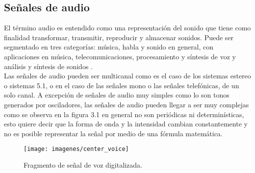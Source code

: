 
\subsection{Señales de audio}

El t\'ermino audio es entendido como una representaci\'on del sonido que tiene como finalidad transformar, transmitir, reproducir y almacenar sonidos. Puede ser segmentado en tres categor\'ias: m\'usica, habla y sonido en general, con aplicaciones en m\'usica, telecomunicaciones, procesamiento y s\'intesis de voz y an\'alisis y s\'intesis de sonidos \cite{schuller}.\\

Las señales de audio pueden ser multicanal como es el caso de los sistemas estereo o sistemas 5.1, o en el caso de las señales mono o las señales telef\'onicas, de un solo canal. A excepci\'on de señales de audio muy simples como lo son tonos generados por osciladores, las señales de audio pueden llegar a ser muy complejas como se observa en la figura 3.1 en general no son peri\'odicas ni determin\'isticas, esto quiere decir que la forma de onda y la intensidad cambian constantemente y no es posible representar la señal por medio de una f\'ormula matem\'atica.\\ 

\begin{figure}[H]
	\begin{center}
	\texttt{[image: imagenes/center\_voice]} \\
	\caption{Fragmento de señal de voz digitalizada.}
	\label{fig:diag_recon_locutor}
	\end{center}
\end{figure}

